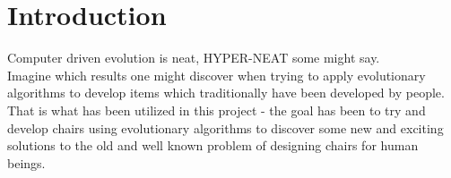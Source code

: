 \section{Introduction}
Computer driven evolution is neat, HYPER-NEAT some might say.\\

Imagine which results one might discover when trying to apply evolutionary algorithms to develop items which traditionally have been developed by people.\\

That is what has been utilized in this project - the goal has been to try and develop chairs using evolutionary algorithms to discover some new and exciting solutions to the old and well known problem of designing chairs for human beings.